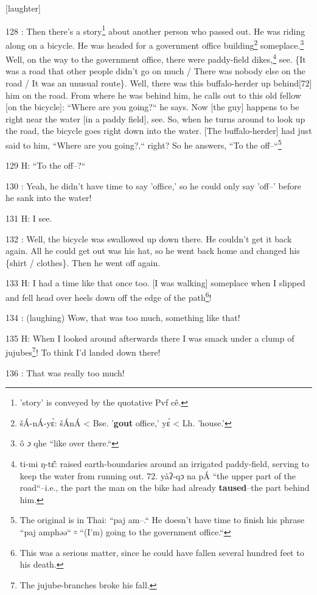 [laughter]

128  : Then there's a story\footnote{'story' is conveyed by the quotative Pvf cê.} about another person who passed out. He was riding
along on a bicycle. He was headed for a government office building\footnote{šÁ-nÁ-yɛ̀: šÁnÁ < Bse. '\textbf{gout }office,' yɛ́ < Lh. 'house.'} someplace.\footnote{ô \emph{ɔ }qhe ``like over there.``}
Well, on the way to the government office, there were paddy-field dikes,\footnote{ti-mi ŋ-tɛ̂: raised earth-boundaries around an irrigated paddy-field, serving to keep the water from running out.  72. yàʔ-qɔ na pÁ ``the upper part of the road``--i.e., the part the man on the bike had already \textbf{taused}--the part behind him.} see.
\{It was a road that other people didn't go on much / There was nobody else on
the road / It was an unusual route\}. Well, there was this buffalo-herder up behind[72]
him on the road. From where he was behind him, he calls out to this old fellow
[on the bicycle]: ``Where are you going?`` he says. Now [the guy]
happens to be right near the water [in a paddy field], see. So, when he turns around
to look up the road, the bicycle goes right down into the water. [The buffalo-herder]
had just said to him, ``Where are you going?,`` right? So he answers,
``To the off--``\footnote{The original is in Thai: ``paj am--.`` He doesn't have time to finish his phrase ``paj amphəə`` ꞊ ``(I'm) going to the government office.``}

129 H: ``To the off--?``

130  : Yeah, he didn't have time to say 'office,' so he could only say 'off--'
before he sank into the water!

131 H: I see.

132  : Well, the bicycle was swallowed up down there. He couldn't get it back again.
All he could get out was his hat, so he went back home and changed his \{shirt
/ clothes\}. Then he went off again.

133 H: I had a time like that once too. [I was walking] someplace when I slipped
and fell head over heels down off the edge of the path\footnote{This was a serious matter, since he could have fallen several hundred feet to his death.}!

134  : (laughing) Wow, that was too much, something like that!

135 H: When I looked around afterwards there I was smack under a clump of jujubes\footnote{The jujube-branches broke his fall.}!
To think I'd landed down there!

136  : That was really too much!

